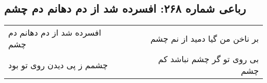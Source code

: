 \begin{center}
\section*{رباعی شماره ۲۶۸: افسرده شد از دم دهانم دم چشم}
\label{sec:sh268}
\begin{longtable}{l p{0.5cm} r}
افسرده شد از دم دهانم دم چشم
&&
بر ناخن من گیا دمید از نم چشم
\\
چشمم ز پی دیدن روی تو بود
&&
بی روی تو گر چشم نباشد کم چشم
\\
\end{longtable}
\end{center}
